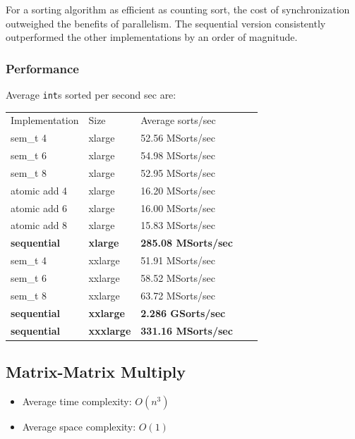 \documentclass{article}
\begin{document}
For a sorting algorithm as efficient as counting sort, the cost of
synchronization outweighed the benefits of parallelism. The sequential
version consistently outperformed the other implementations by an
order of magnitude. 

\subsubsection{Performance}
Average \texttt{int}s sorted per second sec are: 

\begin{center}
\begin{tabular}{lllll}
 Implementation  &  Size      &  Average sorts/sec \\
 sem\_t 4        &  xlarge    &  52.56 MSorts/sec \\
 sem\_t 6        &  xlarge    &  54.98 MSorts/sec \\
 sem\_t 8        &  xlarge    &  52.95 MSorts/sec \\
 atomic add 4    &  xlarge    &  16.20 MSorts/sec \\
 atomic add 6    &  xlarge    &  16.00 MSorts/sec \\
 atomic add 8    &  xlarge    &  15.83 MSorts/sec \\
 \textbf{sequential}      &  \textbf{xlarge}    &  \textbf{285.08 MSorts/sec} \\
 sem\_t 4        &  xxlarge   &  51.91 MSorts/sec \\
 sem\_t 6        &  xxlarge   &  58.52 MSorts/sec \\
 sem\_t 8        &  xxlarge   &  63.72 MSorts/sec \\
 \textbf{sequential}      &  \textbf{xxlarge}   &  \textbf{2.286 GSorts/sec} \\
 \textbf{sequential}      &  \textbf{xxxlarge}  &  \textbf{331.16 MSorts/sec} \\
\end{tabular}
\end{center}

\subsection{Matrix-Matrix Multiply}
\begin{itemize}
\item Average time complexity: $O(n^3)$
\item Average space complexity: $O(1)$ 
\end{itemize}
\end{document}
